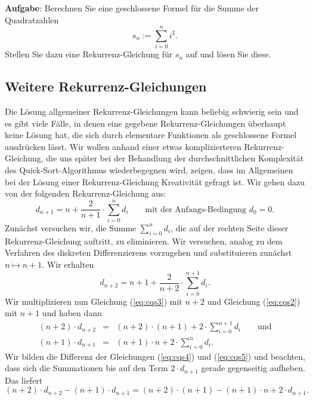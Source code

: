 \noindent
\textbf{Aufgabe}:
Berechnen Sie eine geschlossene Formel für die Summe
der Quadratzahlen
\[ s_n := \sum\limits_{i=0}^{n} i^2. \]
Stellen Sie dazu eine Rekurrenz-Gleichung für $s_n$ auf und lösen Sie diese.

\subsection{Weitere Rekurrenz-Gleichungen}
Die Lösung allgemeiner Rekurrenz-Gleichungen kann beliebig schwierig sein und
es gibt viele Fälle, in denen eine gegebene Rekurrenz-Gleichungen überhaupt keine Lösung
hat, die sich durch elementare Funktionen als geschlossene Formel ausdrücken lässt.
Wir wollen anhand einer etwas komplizierteren Rekurrenz-Gleichung, die uns später bei der Behandlung der
durchschnittlichen Komplexität des Quick-Sort-Algorithmus wiederbegegnen wird, zeigen, dass im Allgemeinen bei
der Lösung einer Rekurrenz-Gleichung Kreativität gefragt ist.
Wir gehen dazu von der folgenden  Rekurrenz-Gleichung aus:
\begin{equation}
  \label{eq:cqs2}
  d_{n+1} = n + \frac{2}{n+1} \cdot \sum_{i=0}^n d_i \qquad \mbox{mit der Anfangs-Bedingung $d_0 = 0$}.   
\end{equation}
Zunächst versuchen wir, die Summe $\sum_{i=0}^n d_i$, die auf der rechten Seite dieser Rekurrenz-Gleichung
auftritt, zu eliminieren.  Wir versuchen, analog zu dem Verfahren des diskreten Differenzierens vorzugehen
und substituieren zunächst $n \mapsto n+1$.  Wir erhalten 
\begin{equation}
  \label{eq:cqs3}
   d_{n+2} = n+1 + \frac{2}{n+2} \cdot \sum_{i=0}^{n+1} d_i.  
\end{equation}
Wir multiplizieren nun Gleichung (\ref{eq:cqs3}) mit $n+2$ und Gleichung (\ref{eq:cqs2}) mit $n+1$ und
haben dann
\begin{eqnarray}
  \label{eq:cqs4}
 (n+2)\cdot d_{n+2} & = & (n+2)\cdot(n+1) + 2 \cdot \sum_{i=0}^{n+1} d_i \qquad \mbox{und} \\
  \label{eq:cqs5}
 (n+1)\cdot d_{n+1} & = & (n+1)\cdot n + 2 \cdot \sum_{i=0}^n d_i.  
\end{eqnarray}
Wir bilden die Differenz der Gleichungen (\ref{eq:cqs4}) und (\ref{eq:cqs5}) und beachten,
dass sich die Summationen bis auf den Term $2\cdot d_{n+1}$ gerade gegenseitig aufheben.
Das liefert
\begin{equation}
  \label{eq:cqs6}
 (n+2)\cdot d_{n+2} - (n+1)\cdot \displaystyle d_{n+1} = (n+2)\cdot(n+1) - (n+1)\cdot n+2 \cdot d_{n+1}.
\end{equation}
